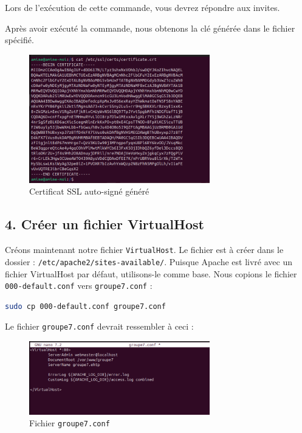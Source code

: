Lors de l'exécution de cette commande, vous devrez répondre aux invites.

Après avoir exécuté la commande, nous obtenons la clé générée dans le fichier spécifié.

\begin{figure}[h]
	\centering
	\includegraphics[width=0.7\textwidth]{HTTPS/certifcate.png}
	\caption{Certificat SSL auto-signé généré}
	\label{fig:certificate}
\end{figure}

\subsection*{4. Créer un fichier VirtualHost}
Créons maintenant notre fichier \texttt{VirtualHost}. Le fichier est à créer dans le dossier : \texttt{/etc/apache2/sites-available/}. Puisque Apache est livré avec un fichier VirtualHost par défaut, utilisons-le comme base. Nous copions le fichier \texttt{000-default.conf} vers \texttt{groupe7.conf} :

\begin{lstlisting}[language=bash]
sudo cp 000-default.conf groupe7.conf
\end{lstlisting}

Le fichier \texttt{groupe7.conf} devrait ressembler à ceci :
		\newpage

\begin{figure}[h]
	\centering
	\includegraphics[width=0.7\textwidth]{HTTPS/groupe7-conf.png}
	\caption{Fichier \texttt{groupe7.conf}}
	\label{fig:groupe7conf}
\end{figure}


